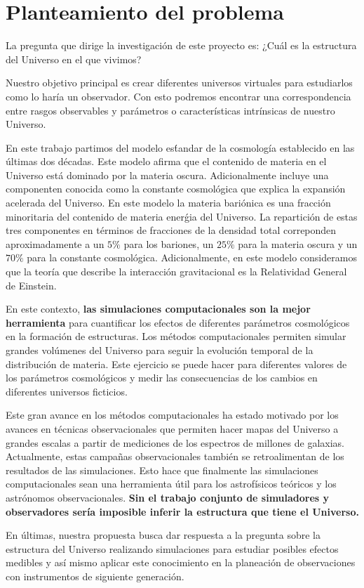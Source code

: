 

\section{Planteamiento del problema}

La pregunta que dirige la investigaci\'on de este proyecto es: ¿Cu\'al es la estructura del Universo en el que vivimos?

Nuestro objetivo principal es crear diferentes universos virtuales
para estudiarlos como lo har\'ia un observador. Con esto podremos
encontrar una correspondencia entre rasgos observables y
par\'ametros o caracter\'isticas intr\'insicas de nuestro Universo.

En este trabajo partimos del modelo es\'tandar de la cosmolog\'ia
establecido en las \'ultimas dos d\'ecadas. Este modelo afirma que el
contenido de materia en el Universo est\'a dominado por la materia oscura. 
Adicionalmente incluye una componenten conocida como la constante
cosmol\'ogica  que explica la expansi\'on acelerada del Universo. 
En este modelo la materia bari\'onica es una fracci\'on minoritaria
del contenido de materia ener\'gia del Universo. 
La repartici\'on de estas tres componentes en t\'erminos de fracciones
de la densidad total correponden aproximadamente a un $5\%$ para los
bariones, un $25\%$ para la materia oscura y un $70\%$ para la
constante cosmol\'ogica. Adicionalmente, en este modelo consideramos
que la teor\'ia que describe la interacci\'on gravitacional es la
Relatividad General de Einstein. 

En este contexto, {\bf las simulaciones computacionales son la mejor
herramienta} para cuantificar los efectos de diferentes par\'ametros
cosmol\'ogicos en la formaci\'on de estructuras. 
Los  m\'etodos computacionales permiten simular grandes vol\'umenes
del Universo para seguir la evoluci\'on temporal de la distribuci\'on
de materia. 
Este ejercicio se puede hacer para diferentes valores de los
par\'ametros cosmol\'ogicos y  medir las consecuencias de los cambios
en diferentes universos ficticios.  


Este gran avance en los m\'etodos computacionales ha estado motivado por
los avances en t\'ecnicas observacionales que permiten hacer mapas del
Universo a grandes escalas a partir de mediciones de los espectros de
millones de galaxias.   
Actualmente, estas campa\~nas observacionales tambi\'en se
retroalimentan de los resultados de las simulaciones. 
Esto hace que finalmente las simulaciones computacionales sean una
herramienta \'util para los astrof\'isicos te\'oricos y los
astr\'onomos observacionales. {\bf Sin el trabajo conjunto de
  simuladores y observadores ser\'ia imposible inferir la estructura
  que tiene el Universo.} 

En \'ultimas, nuestra propuesta busca dar respuesta a la pregunta sobre la
estructura del Universo realizando simulaciones para estudiar posibles
efectos medibles y as\'i mismo aplicar este conocimiento en la
planeaci\'on de observaciones con instrumentos de siguiente
generaci\'on.  

